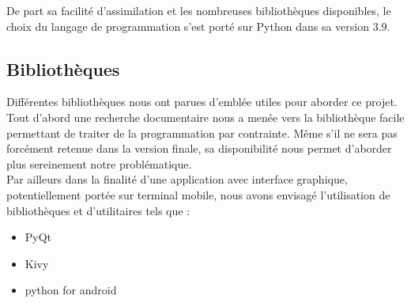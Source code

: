De part sa facilité d'assimilation et les nombreuses bibliothèques disponibles, le choix du langage de programmation
s'est porté sur Python dans sa version 3.9.

\subsection{Bibliothèques}

Différentes bibliothèques nous ont parues d'emblée utiles pour aborder ce projet. Tout d'abord
une recherche documentaire nous a menée vers la bibliothèque \textsf{facile} permettant de traiter
de la programmation par contrainte. Même s'il ne sera pas forcément retenue dans la version finale, 
sa disponibilité nous permet d'aborder plus sereinement notre problématique.\\

Par ailleurs dans la finalité d'une application avec interface graphique, potentiellement portée sur terminal mobile,
 nous avons envisagé l'utilisation de bibliothèques et d'utilitaires tels que :

 \begin{itemize}
     \item \textsf{PyQt}
     \item \textsf{Kivy}
     \item \textsf{python for android}
 \end{itemize}